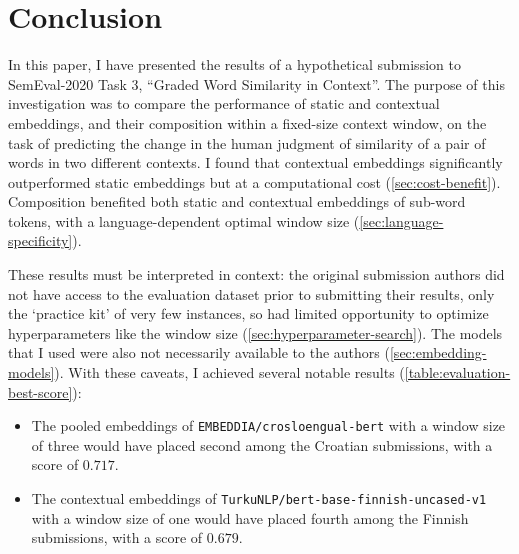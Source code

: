 \section{Conclusion}
\label{sec:conclusion}

In this paper, I have presented the results of a hypothetical submission to
SemEval-2020 Task 3, ``Graded Word Similarity in Context''.
The purpose of this investigation was to compare the performance of static and
contextual embeddings, and their composition within a fixed-size context window, on the
task of predicting the change in the human judgment of similarity of a pair of words in
two different contexts.
I found that contextual embeddings significantly outperformed static embeddings but at
a computational cost (\cref{sec:cost-benefit}).
Composition benefited both static and contextual embeddings of sub-word tokens, with a
language-dependent optimal window size (\cref{sec:language-specificity}).

These results must be interpreted in context: the original submission authors did not
have access to the evaluation dataset prior to submitting their results, only the
`practice kit' of very few instances, so had limited opportunity to optimize
hyperparameters like the window size (\cref{sec:hyperparameter-search}).
The models that I used were also not necessarily available to the authors
(\cref{sec:embedding-models}).
With these caveats, I achieved several notable results (\cref{table:evaluation-best-score}):
\begin{itemize}
  \item The pooled embeddings of \texttt{EMBEDDIA/crosloengual-bert} with a window
        size of three would have placed second among the Croatian submissions, with a
        score of $0.717$.
  \item The contextual embeddings of \texttt{TurkuNLP/bert-base-finnish-uncased-v1}
        with a window size of one would have placed fourth among the Finnish
        submissions, with a score of $0.679$.
\end{itemize}
